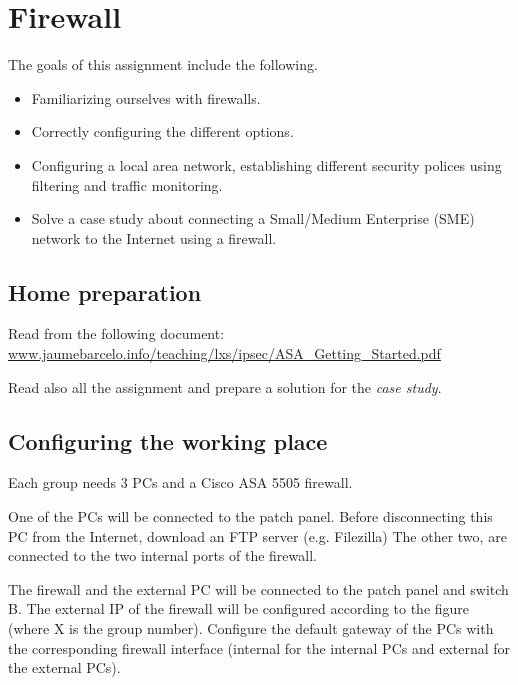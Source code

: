 \chapter{Firewall}

The goals of this assignment include the following.

\begin{itemize}
\item Familiarizing ourselves with firewalls.
\item Correctly configuring the different options.
\item Configuring a local area network, establishing different security polices using filtering and traffic monitoring.
\item Solve a case study about connecting a Small/Medium Enterprise (SME) network to the Internet using a firewall.
\end{itemize}

\section{Home preparation}

Read from the following document:
\url{www.jaumebarcelo.info/teaching/lxs/ipsec/ASA_Getting_Started.pdf}

Read also all the assignment and prepare a solution for the \emph{case study}.

\section{Configuring the working place}
Each group needs 3 PCs and a Cisco ASA 5505 firewall.

One of the PCs will be connected to the patch panel.
Before disconnecting this PC from the Internet, download an FTP server (e.g. Filezilla)
The other two, are connected to the two internal ports of the firewall.

The firewall and the external PC will be connected to the patch panel and switch B.
The external IP of the firewall will be configured according to the figure (where X is the group number).
Configure the default gateway of the PCs with the corresponding firewall interface (internal for the internal PCs and external for the external PCs).

